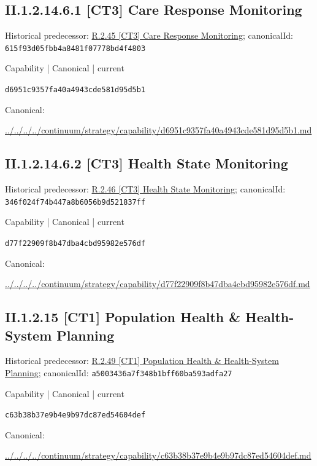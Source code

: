 \documentclass[10pt,a4paper]{article}
\begin{document}
\subsection*{II.1.2.14.6.1 [CT3] Care Response Monitoring}
Historical predecessor: \hyperref[element-615f93d05fbb4a8481f07778bd4f4803]{R.2.45 [CT3] Care Response Monitoring}; canonicalId: \texttt{615f93d05fbb4a8481f07778bd4f4803}\par
\label{element-d6951c9357fa40a4943cde581d95d5b1}
{\small Capability | Canonical | current}\par
\texttt{d6951c9357fa40a4943cde581d95d5b1}\par
Canonical: \par
{\footnotesize\url{../../../../continuum/strategy/capability/d6951c9357fa40a4943cde581d95d5b1.md}}\par
\subsection*{II.1.2.14.6.2 [CT3] Health State Monitoring}
Historical predecessor: \hyperref[element-346f024f74b447a8b6056b9d521837ff]{R.2.46 [CT3] Health State Monitoring}; canonicalId: \texttt{346f024f74b447a8b6056b9d521837ff}\par
\label{element-d77f22909f8b47dba4cbd95982e576df}
{\small Capability | Canonical | current}\par
\texttt{d77f22909f8b47dba4cbd95982e576df}\par
Canonical: \par
{\footnotesize\url{../../../../continuum/strategy/capability/d77f22909f8b47dba4cbd95982e576df.md}}\par
\subsection*{II.1.2.15 [CT1] Population Health \& Health-System Planning}
Historical predecessor: \hyperref[element-a5003436a7f348b1bff60ba593adfa27]{R.2.49 [CT1] Population Health \& Health-System Planning}; canonicalId: \texttt{a5003436a7f348b1bff60ba593adfa27}\par
\label{element-c63b38b37e9b4e9b97dc87ed54604def}
{\small Capability | Canonical | current}\par
\texttt{c63b38b37e9b4e9b97dc87ed54604def}\par
Canonical: \par
{\footnotesize\url{../../../../continuum/strategy/capability/c63b38b37e9b4e9b97dc87ed54604def.md}}\par
\end{document}
